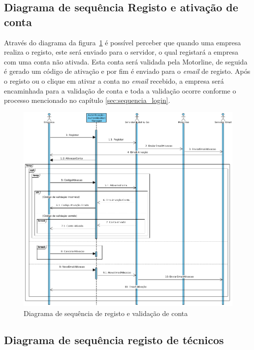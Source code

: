 \newpage

\subsection{Diagrama de sequência Registo e ativação de conta}

Através do diagrama da figura~\ref{fig:44} é possível perceber que quando uma empresa realiza o registo, este será enviado para o servidor, o qual registará a empresa com uma conta não ativada. Esta conta será validada pela Motorline, de seguida é gerado um código de ativação e por fim é enviado para o \textit{email} de registo. Após o registo ou o clique em ativar a conta no \textit{email} recebido, a empresa será encaminhada para a validação de conta e toda a validação ocorre conforme o processo mencionado no capítulo \ref{sec:sequencia_login}.

\begin{figure}[htb]
  \centering
  \includegraphics[width=\textwidth]{images/diagramas/sequencia/diagrama_registo.png}
  \caption{Diagrama de sequência de registo e validação de conta}
  \label{fig:44}
\end{figure}

\newpage

\subsection{Diagrama de sequência registo de técnicos}

